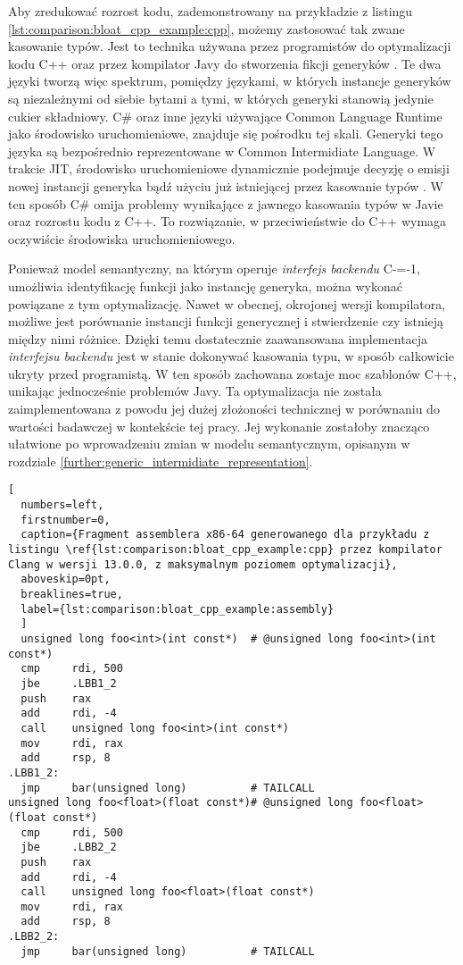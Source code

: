 Aby zredukować rozrost kodu, zademonstrowany na przykładzie z listingu \ref{lst:comparison:bloat_cpp_example:cpp}, możemy zastosować tak zwane kasowanie typów.
Jest to technika używana przez programistów do optymalizacji kodu C++ \cite{becker2007:type_erasure} oraz przez kompilator Javy do stworzenia fikcji generyków \cite{nino2007:cost_type_erasure_java}.
Te dwa języki tworzą więc spektrum, pomiędzy językami, w których instancje generyków są niezależnymi od siebie bytami a tymi, w których generyki stanowią jedynie cukier składniowy.
C\# oraz inne języki używające Common Language Runtime jako środowisko uruchomieniowe, znajduje się pośrodku tej skali.
Generyki tego języka są bezpośrednio reprezentowane w Common Intermidiate Language.
W trakcie JIT, środowisko uruchomieniowe dynamicznie podejmuje decyzję o emisji nowej instancji generyka bądź użyciu już istniejącej przez kasowanie typów \cite{kennedy2001:design_clr_generics}.
W ten sposób C\# omija problemy wynikające z jawnego kasowania typów w Javie oraz rozrostu kodu z C++.
To rozwiązanie, w przeciwieństwie do C++ wymaga oczywiście środowiska uruchomieniowego.

Ponieważ model semantyczny, na którym operuje \emph{interfejs backendu} C-=-1, umożliwia identyfikację funkcji jako instancję generyka, można wykonać powiązane z tym optymalizację.
Nawet w obecnej, okrojonej wersji kompilatora, możliwe jest porównanie instancji funkcji generycznej i stwierdzenie czy istnieją między nimi różnice.
Dzięki temu dostatecznie zaawansowana implementacja \emph{interfejsu backendu} jest w stanie dokonywać kasowania typu, w sposób całkowicie ukryty przed programistą.
W ten sposób zachowana zostaje moc szablonów C++, unikając jednocześnie problemów Javy.
Ta optymalizacja nie została zaimplementowana z powodu jej dużej złożoności technicznej w porównaniu do wartości badawczej w kontekście tej pracy.
Jej wykonanie zostałoby znacząco ułatwione po wprowadzeniu zmian w modelu semantycznym, opisanym w rozdziale \ref{further:generic_intermidiate_representation}.

\begin{lstlisting}[
  numbers=left,
  firstnumber=0,
  caption={Fragment assemblera x86-64 generowanego dla przykładu z listingu \ref{lst:comparison:bloat_cpp_example:cpp} przez kompilator Clang w wersji 13.0.0, z maksymalnym poziomem optymalizacji},
  aboveskip=0pt,
  breaklines=true,
  label={lst:comparison:bloat_cpp_example:assembly}
  ]
  unsigned long foo<int>(int const*)  # @unsigned long foo<int>(int const*)
  cmp     rdi, 500
  jbe     .LBB1_2
  push    rax
  add     rdi, -4
  call    unsigned long foo<int>(int const*)
  mov     rdi, rax
  add     rsp, 8
.LBB1_2:
  jmp     bar(unsigned long)          # TAILCALL
unsigned long foo<float>(float const*)# @unsigned long foo<float>(float const*)
  cmp     rdi, 500
  jbe     .LBB2_2
  push    rax
  add     rdi, -4
  call    unsigned long foo<float>(float const*)
  mov     rdi, rax
  add     rsp, 8
.LBB2_2:
  jmp     bar(unsigned long)          # TAILCALL
\end{lstlisting}



